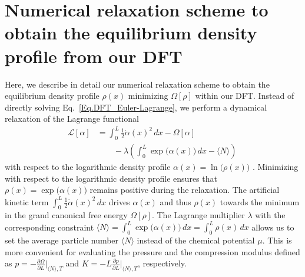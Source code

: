 \documentclass[aps,pre,twocolumn,superscriptaddress,nofootinbib]{revtex4}
\begin{document}
\section{Numerical relaxation scheme to obtain the equilibrium density profile from our DFT} %
Here, we describe in detail our numerical relaxation scheme to obtain the equilibrium density profile $\rho(x)$ minimizing $\Omega[\rho]$ within our DFT. 
Instead of directly solving Eq.~\eqref{Eq.DFT_Euler-Lagrange}, we perform a dynamical relaxation of the Lagrange functional
%
\begin{equation}
	\begin{aligned}
		\mathcal{L}[\alpha] &= \int_{0}^{L} \frac{1}{2} \dot{\alpha}(x)^2\, dx - \Omega[\alpha] \\
			&\qquad - \lambda \left( \int_{0}^{L} \exp\big(\alpha(x) \big) \,dx - \langle N \rangle \right) \, 
	\end{aligned}
	\label{Eq.DFT_grand_functional_dynamical}
\end{equation}
%
with respect to the logarithmic density profile $\alpha(x) = \ln\big( \rho(x) \big)$ \cite{Ohnesorge1994_PhysRevE}.
Minimizing with respect to the logarithmic density profile ensures that $\rho(x) = \exp\big( \alpha(x) \big)$ remains positive during the relaxation.
The artificial kinetic term $\int_{0}^{L} \frac{1}{2} \dot{\alpha}(x)^2 \, dx$ drives $\alpha(x)$  and thus $\rho(x)$ towards the minimum in the grand canonical free energy $\Omega[\rho]$. 
The Lagrange multiplier $\lambda$ with the corresponding constraint $\langle N \rangle = \int_{0}^{L} \exp\big( \alpha(x) \big) \, dx = \int_{0}^{L} \rho(x) \,dx$ allows us to set the average particle number $\langle N \rangle$ instead of the chemical potential $\mu$. 
This is more convenient for evaluating the pressure and the compression modulus defined as $p = -\frac{\partial \Omega}{\partial L}\big\vert_{\langle N \rangle, T}$ and $K = -L \frac{\partial p}{\partial L}\big\vert_{\langle N \rangle, T}$, respectively.
\end{document}
